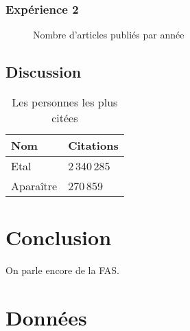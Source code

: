 \documentclass[phd]{dissertum}
\begin{document}
      \subsection{Expérience 2}
        \lipsum[14]
        \begin{figure}
          \centering
          \caption{Nombre d'articles publiés par année}
        \end{figure}
    \section{Discussion}
      \lipsum[15-19]
      \begin{table}
        \centering
        \begin{tabular}{ll}
          \toprule
          \bf Nom & \bf Citations \\
          \midrule
          Etal & 2\,340\,285 \\
          Aparaître & 270\,859 \\ 
          \bottomrule
        \end{tabular}
        \caption{Les personnes les plus citées}
      \end{table}

  \chapter{Conclusion}
    On parle encore de la \ac{FAS}.
    \lipsum[7-10]

  
  
  
  
  \appendix
  \chapter{Données}
    \lipsum[11-20]
\end{document}
